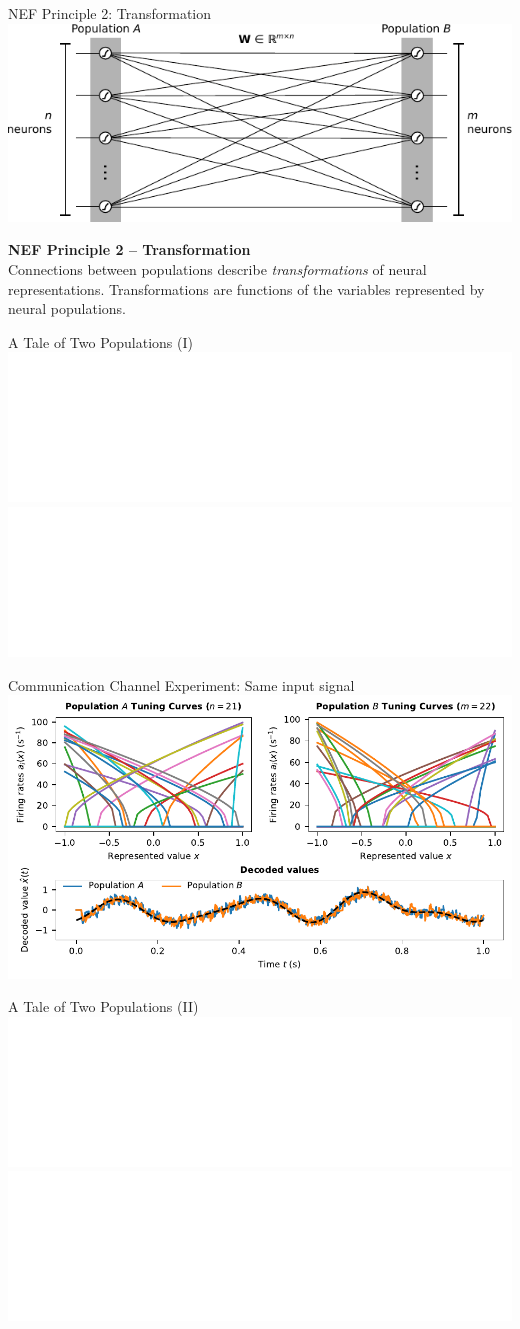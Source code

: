 \documentclass[handout,aspectratio=169]{beamer}
\begin{document}
  \begin{frame}{NEF Principle 2: Transformation}
		\centering
		\includegraphics[scale=1.175]{media/transformation_fully_connected.pdf}
		\begin{mdframed}
			\textbf{NEF Principle 2 -- Transformation}\\
			Connections between populations describe \emph{transformations} of neural representations. Transformations are functions of the variables represented by neural populations.
		\end{mdframed}
	\end{frame}
	
	\begin{frame}{A Tale of Two Populations (I)}
		\hspace*{-1.2cm}%
		\includegraphics<1>[width=1.175\textwidth]{media/transformation_01.pdf}%
		\includegraphics<2>[width=1.175\textwidth]{media/transformation_02.pdf}%
	\end{frame}

	\begin{frame}{Communication Channel Experiment: Same input signal}
		\includegraphics[width=\textwidth]{media/two_populations_decoding.pdf}
	\end{frame}

	\begin{frame}{A Tale of Two Populations (II)}
		\hspace*{-1.2cm}%
		\includegraphics<1>[width=1.175\textwidth]{media/transformation_03.pdf}%
		\includegraphics<2>[width=1.175\textwidth]{media/transformation_04.pdf}%
	\end{frame}
\end{document}
